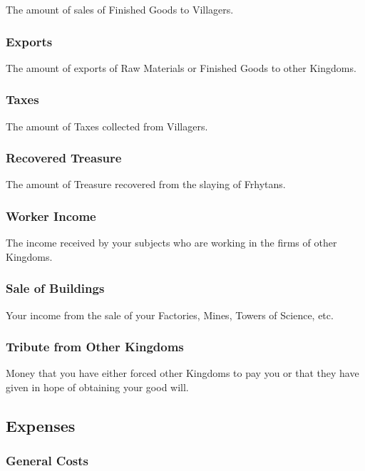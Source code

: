 The amount of sales of Finished Goods to Villagers.

\subsubsection{Exports}

The amount of exports of Raw Materials or Finished Goods to other Kingdoms.

\subsubsection{Taxes}

The amount of Taxes collected from Villagers.

\subsubsection{Recovered Treasure}

The amount of Treasure recovered from the slaying of Frhytans.

\subsubsection{Worker Income}

The income received by your subjects who are working in the firms of other Kingdoms.

\subsubsection{Sale of Buildings}

Your income from the sale of your Factories, Mines, Towers of Science, etc.

\subsubsection{Tribute from Other Kingdoms}

Money that you have either forced other Kingdoms to pay you or that they have given in hope of obtaining your good will.

\subsection{Expenses}


\subsubsection{General Costs}

